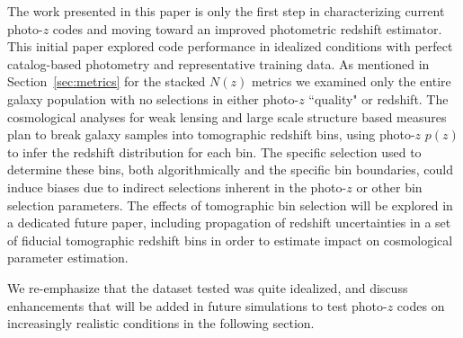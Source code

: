 

The work presented in this paper is only the first step in characterizing current photo-$z$ codes and moving toward an improved photometric redshift estimator.
This initial paper explored code performance in idealized conditions with perfect catalog-based photometry and representative training data.
As mentioned in Section~\ref{sec:metrics} for the stacked $N(z)$ metrics we examined only the entire galaxy population with no selections in either photo-$z$ ``quality" or redshift.
The cosmological analyses for weak lensing and large scale structure based measures plan to break galaxy samples into tomographic redshift bins, using photo-$z$ $p(z)$ to infer the redshift distribution for each bin.
The specific selection used to determine these bins, both algorithmically and the specific bin boundaries, could induce biases due to indirect selections inherent in the photo-$z$ or other bin selection parameters.
The effects of tomographic bin selection will be explored in a dedicated future paper, including propagation of redshift uncertainties in a set of fiducial tomographic redshift bins in order to estimate impact on cosmological parameter estimation.


We re-emphasize that the dataset tested was quite idealized, and discuss enhancements that will be added in future simulations to test photo-$z$ codes on increasingly realistic conditions in the following section.

